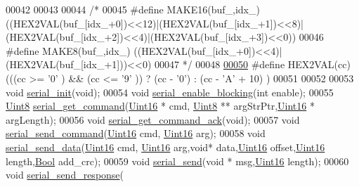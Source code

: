 \begin{DoxyCode}
00042 
00043 
00044 \textcolor{comment}{/*}
00045 \textcolor{comment}{#define MAKE16(buf\_,idx\_)
       ((HEX2VAL(buf\_[idx\_+0])<<12)|(HEX2VAL(buf\_[idx\_+1])<<8)|(HEX2VAL(buf\_[idx\_+2])<<4)|(HEX2VAL(buf\_[idx\_+3])<<0))}
00046 \textcolor{comment}{#define MAKE8(buf\_,idx\_)  ((HEX2VAL(buf\_[idx\_+0])<<4)|(HEX2VAL(buf\_[idx\_+1]))<<0)}
00047 \textcolor{comment}{*/}
00048 
\hypertarget{a00031_source_l00050}{}\hyperlink{a00031_a428b04d2e2f2da2ea031a6c731660a71}{00050} \textcolor{preprocessor}{#define HEX2VAL(cc)  (((cc >= '0' ) && (cc <= '9' )) ? (cc - '0') : (cc - 'A' + 10) )}
00051 
00052 
00053 \textcolor{keywordtype}{void}                \hyperlink{a00031_ad2b461e9e9044364a28a61cfadcacdd8}{serial\_init}(\textcolor{keywordtype}{void});
00054 \textcolor{keywordtype}{void}                \hyperlink{a00031_af15ca641f181de14f789d97b00c367ef}{serial\_enable\_blocking}(\textcolor{keywordtype}{int} enable);
00055 \hyperlink{a00072_af84840501dec18061d18a68c162a8fa2}{Uint8}              \hyperlink{a00031_a366b2707f4c7d76f0efc1b5cdde8e37e}{serial\_get\_command}(\hyperlink{a00072_a59a9f6be4562c327cbfb4f7e8e18f08b}{Uint16} * cmd,
      \hyperlink{a00072_af84840501dec18061d18a68c162a8fa2}{Uint8} ** argStrPtr,\hyperlink{a00072_a59a9f6be4562c327cbfb4f7e8e18f08b}{Uint16} * argLength);
00056 \textcolor{keywordtype}{void}                \hyperlink{a00031_a7fc7421ed15d6e4516e9878e7455d715}{serial\_get\_command\_ack}(\textcolor{keywordtype}{void});
00057 \textcolor{keywordtype}{void}                \hyperlink{a00031_aaac89aaa2fbc24d91501b0695195b235}{serial\_send\_command}(\hyperlink{a00072_a59a9f6be4562c327cbfb4f7e8e18f08b}{Uint16}  cmd,
      \hyperlink{a00072_a59a9f6be4562c327cbfb4f7e8e18f08b}{Uint16}  arg);
00058 \textcolor{keywordtype}{void}                            \hyperlink{a00031_ac9bd1d3814679f03e2a9bfa63a221946}{serial\_send\_data}(\hyperlink{a00072_a59a9f6be4562c327cbfb4f7e8e18f08b}{Uint16} cmd,
      \hyperlink{a00072_a59a9f6be4562c327cbfb4f7e8e18f08b}{Uint16}  arg,\textcolor{keywordtype}{void}* data,\hyperlink{a00072_a59a9f6be4562c327cbfb4f7e8e18f08b}{Uint16} offset,\hyperlink{a00072_a59a9f6be4562c327cbfb4f7e8e18f08b}{Uint16} length,\hyperlink{a00072_a253b248072cfc8bd812c69acd0046eed}{Bool} add\_crc);
00059 \textcolor{keywordtype}{void}                \hyperlink{a00031_a17f65cf9dbacdfb97cb2536ed0097ccb}{serial\_send}(\textcolor{keywordtype}{void} * msg,\hyperlink{a00072_a59a9f6be4562c327cbfb4f7e8e18f08b}{Uint16} length);
00060 \textcolor{keywordtype}{void}                            \hyperlink{a00031_a96a3f016ca5b0736424c2695fe9fbdf8}{serial\_send\_response}(

\end{DoxyCode}
